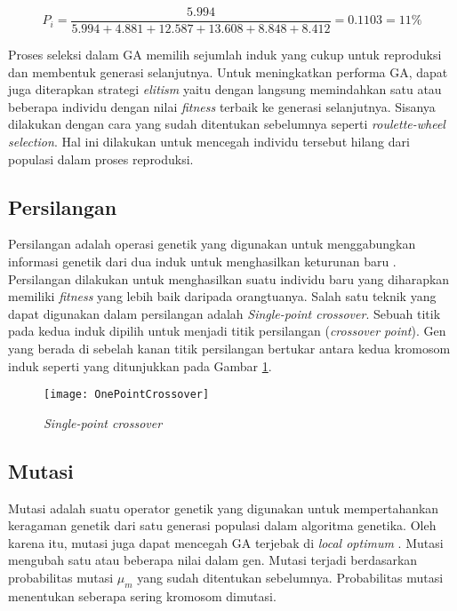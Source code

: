 \begin{equation}
	\label{eq:ProbExample}
	P_i=\frac{5.994}{5.994 + 4.881 + 12.587 + 13.608 + 8.848 + 8.412} = 0.1103 = 11 \%
\end{equation}

Proses seleksi dalam GA memilih sejumlah induk yang cukup untuk reproduksi dan membentuk generasi selanjutnya. Untuk meningkatkan performa GA, dapat juga diterapkan strategi \textit{elitism} yaitu dengan langsung memindahkan satu atau beberapa individu dengan nilai \textit{fitness} terbaik ke generasi selanjutnya. Sisanya dilakukan dengan cara yang sudah ditentukan sebelumnya seperti \textit{roulette-wheel selection}. Hal ini dilakukan untuk mencegah individu tersebut hilang dari populasi dalam proses reproduksi.

\subsection{Persilangan}
\label{sub:crossover}
Persilangan adalah operasi genetik yang digunakan untuk menggabungkan informasi genetik dari dua induk untuk menghasilkan keturunan baru \cite{sivanandam2007introduction}. Persilangan dilakukan untuk menghasilkan suatu individu baru yang diharapkan memiliki \textit{fitness} yang lebih baik daripada orangtuanya. Salah satu teknik yang dapat digunakan dalam persilangan adalah \textit{Single-point crossover}. Sebuah titik pada kedua induk dipilih untuk menjadi titik persilangan (\textit{crossover point}). Gen yang berada di sebelah kanan titik persilangan bertukar antara kedua kromosom induk seperti yang ditunjukkan pada Gambar \ref{fig:spcrossover}.

\begin{figure}[h]
	\begin{center}
		\texttt{[image: OnePointCrossover]}
		\caption{\textit{Single-point crossover}}
		\label{fig:spcrossover}
	\end{center}
\end{figure}

\subsection{Mutasi}
\label{sub:mutation}
Mutasi adalah suatu operator genetik yang digunakan untuk mempertahankan keragaman genetik dari satu generasi populasi dalam algoritma genetika. Oleh karena itu, mutasi juga dapat mencegah GA terjebak di \textit{local optimum} \cite{sivanandam2007introduction}. Mutasi mengubah satu atau beberapa nilai dalam gen. Mutasi terjadi berdasarkan probabilitas mutasi $\mu_m$ yang sudah ditentukan sebelumnya. Probabilitas mutasi menentukan seberapa sering kromosom dimutasi. 

